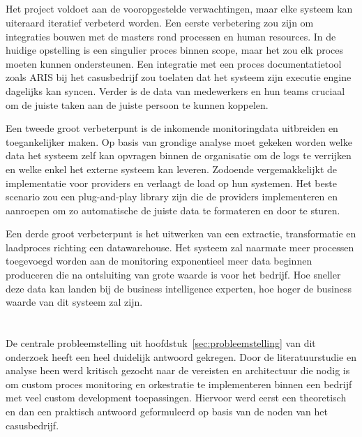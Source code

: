 \subsection{}%
\label{subsec:mogelijke verbeteringen}
Het project voldoet aan de vooropgestelde verwachtingen, maar elke systeem kan uiteraard iteratief verbeterd worden. Een eerste verbetering zou zijn om integraties bouwen met de masters rond processen en human resources. In de huidige opstelling is een singulier proces binnen scope, maar het zou elk proces moeten kunnen ondersteunen. Een integratie met een proces documentatietool zoals ARIS bij het casusbedrijf zou toelaten dat het systeem zijn executie engine dagelijks kan syncen.  Verder is de data van medewerkers en hun teams cruciaal om de juiste taken aan de juiste persoon te kunnen koppelen. \newline

Een tweede groot verbeterpunt is de inkomende monitoringdata uitbreiden en toegankelijker maken. Op basis van grondige analyse moet gekeken worden welke data het systeem zelf kan opvragen binnen de organisatie om de logs te verrijken en welke enkel het externe systeem kan leveren. Zodoende vergemakkelijkt de implementatie voor providers en verlaagt de load op hun systemen. Het beste scenario zou een plug-and-play library zijn die de providers implementeren en aanroepen om zo automatische de juiste data te formateren en door te sturen. \newline

Een derde groot verbeterpunt is het uitwerken van een extractie, transformatie en laadproces richting een datawarehouse. Het systeem zal naarmate meer processen toegevoegd worden aan de monitoring exponentieel meer data beginnen produceren die na ontsluiting van grote waarde is voor het bedrijf. Hoe sneller deze data kan landen bij de business intelligence experten, hoe hoger de business waarde van dit systeem zal zijn.

\section{}%
\label{sec:onderzoeksvraag conclusie}
\subsection{}%
\label{subsec:probleemstelling conclusie}
De centrale probleemstelling uit hoofdstuk~\ref{sec:probleemstelling} van dit onderzoek heeft een heel duidelijk antwoord gekregen. Door de literatuurstudie en analyse heen werd kritisch gezocht naar de vereisten en architectuur die nodig is om custom proces monitoring en orkestratie te implementeren binnen een bedrijf met veel custom development toepassingen. Hiervoor werd eerst een theoretisch en dan een praktisch antwoord geformuleerd op basis van de noden van het casusbedrijf.

